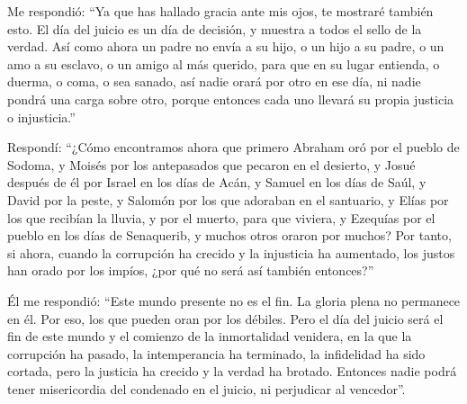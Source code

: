  Me respondió: ``Ya que has hallado gracia ante mis
ojos, te mostraré también esto. El día del juicio es un día de decisión,
y muestra a todos el sello de la verdad. Así como ahora un padre no
envía a su hijo, o un hijo a su padre, o un amo a su esclavo, o un amigo
al más querido, para que en su lugar entienda, o duerma, o coma, o sea
sanado,  así nadie orará por otro en ese día, ni nadie
pondrá una carga sobre otro, porque entonces cada uno llevará su propia
justicia o injusticia.''

 Respondí: ``¿Cómo encontramos ahora que primero Abraham
oró por el pueblo de Sodoma, y Moisés por los antepasados que pecaron en
el desierto,  y Josué después de él por Israel en los
días de Acán,  y Samuel en los días de Saúl, y David por
la peste, y Salomón por los que adoraban en el santuario,
 y Elías por los que recibían la lluvia, y por el
muerto, para que viviera,  y Ezequías por el pueblo en
los días de Senaquerib, y muchos otros oraron por muchos?
 Por tanto, si ahora, cuando la corrupción ha crecido y
la injusticia ha aumentado, los justos han orado por los impíos, ¿por
qué no será así también entonces?''

 Él me respondió: ``Este mundo presente no es el fin. La
gloria plena no permanece en él. Por eso, los que pueden oran por los
débiles.  Pero el día del juicio será el fin de este
mundo y el comienzo de la inmortalidad venidera, en la que la corrupción
ha pasado,  la intemperancia ha terminado, la
infidelidad ha sido cortada, pero la justicia ha crecido y la verdad ha
brotado.  Entonces nadie podrá tener misericordia del
condenado en el juicio, ni perjudicar al vencedor''.

